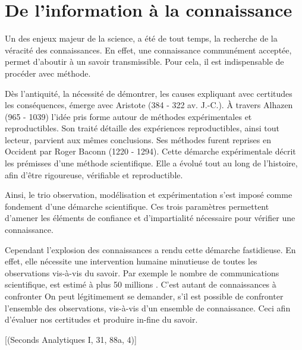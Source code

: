 \chapter*{De l'information à la connaissance}

Un des enjeux majeur de la science, a été de tout temps, la recherche de la véracité des connaissances. En effet, une connaissance communément acceptée, permet d'aboutir à un savoir transmissible. Pour cela, il est indispensable de procéder avec méthode.

Dès l'antiquité, la nécessité de démontrer, les causes expliquant avec certitudes les conséquences, émerge avec Aristote (384 - 322 av. J.-C.). À travers Alhazen (965 - 1039) l'idée pris forme autour de méthodes expérimentales et reproductibles. Son traité  détaille des expériences reproductibles, ainsi tout lecteur, parvient aux mêmes conclusions. Ses méthodes furent reprises en Occident par Roger Baconn (1220 - 1294). Cette démarche expérimentale décrit les prémisses d'une méthode scientifique. Elle a évolué tout au long de l'histoire, afin d'être rigoureuse, vérifiable et reproductible.

Ainsi, le trio observation, modélisation et expérimentation s'est imposé comme fondement d'une démarche scientifique. Ces trois paramètres permettent d'amener les éléments de confiance et d'impartialité nécessaire pour vérifier une connaissance.

Cependant l'explosion des connaissances a rendu cette démarche fastidieuse. En effet, elle nécessite une intervention humaine minutieuse de toutes les observations vis-à-vis du savoir. Par exemple le nombre de communications scientifique, est estimé à plus 50 millions \citep[voir][]{LEAP:LEAP0509}. C'est autant de connaissances à confronter  On peut légitimement se demander, s'il est possible de confronter l'ensemble des observations, vis-à-vis d'un ensemble de connaissance. Ceci afin d'évaluer nos certitudes et produire in-fine du savoir.

[(Seconds Analytiques I, 31, 88a, 4)]

